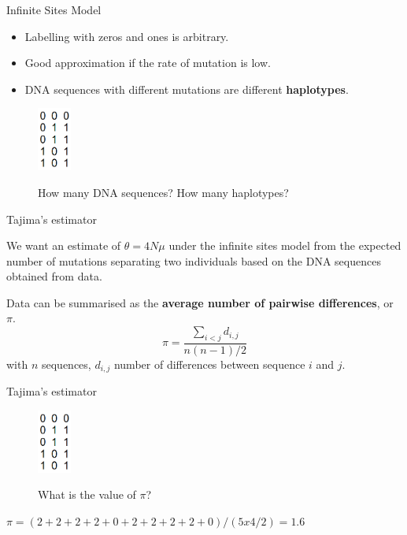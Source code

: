 \begin{frame}{Infinite Sites Model}

	\begin{itemize}
		\item Labelling with zeros and ones is arbitrary.
		\item Good approximation if the rate of mutation is low.
		\item DNA sequences with different mutations are different \textbf{haplotypes}.
	\end{itemize}

	\begin{figure}
                \includegraphics[width=0.1\textwidth]{Pics/sequences01_only} \\
		\caption{How many DNA sequences? How many haplotypes?}
        \end{figure}

\end{frame}


\begin{frame}{Tajima's estimator}

	We want an estimate of $\theta=4N\mu$ under the infinite sites model from the expected number of
	mutations separating two individuals based on the DNA sequences obtained from data.

	\pause
	\bigskip

	Data can be summarised as the \textbf{average number of pairwise differences}, or $\pi$.
	\begin{equation}
		\pi = \frac{\sum_{i<j}d_{i,j}}{n(n-1)/2}
	\end{equation}
	with $n$ sequences, $d_{i,j}$ number of differences between sequence $i$ and $j$.

\end{frame}


\begin{frame}{Tajima's estimator}

	\begin{figure}
                \includegraphics[width=0.1\textwidth]{Pics/sequences01_only} \\
		\caption{What is the value of $\pi$?}
        \end{figure}

	\pause
	$\pi = (2+2+2+2+0+2+2+2+2+0)/(5x4/2)=1.6$

\end{frame}


